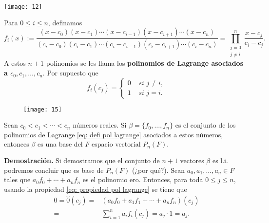 \begin{marginfigure}
\texttt{[image: 12]} 
\end{marginfigure}

Para $0 \leq i \leq n$, definamos
\begin{equation}
	\label{eq: defi pol lagrange}
	f_{i}(x) := \frac{
	(x-c_{0}) (x-c_{1}) \cdots (x-c_{i-1})
	(x-c_{i+1}) \cdots (x-c_{n})
	}{(c_{i} - c_{0}) (c_{i}-c_{1}) \cdots
	(c_{i}-c_{i-1})(c_{i}-c_{i+1}) \cdots (c_{i}-c_{n}) }
	= \prod_{\substack{j=0 \\ j \neq i}}^{n} \frac{x-c_{j}}{c_{i}-c_{j}}.
\end{equation}
A estos $n+1$ polinomios se les llama los
\textbf{polinomios de Lagrange asociados a $c_{0}, c_{1}, \ldots , c_{n}$}.
Por supuesto que
\begin{equation}
	\label{eq: propiedad pol lagrange}
	f_{i}(c_{j}) 
	= \begin{cases}
	0 & \textit{ si } j \neq i, \\
	1 & \textit{ si } j = i.
	\end{cases}
\end{equation}

\begin{figure}[H]
	\centering
	\texttt{[image: 15]} 
\end{figure}	



\begin{prop}
Sean $c_{0} < c_{1} < \cdots < c_{n}$ números reales. Si
$\beta = \{ f_{0}, \ldots, f_{n} \}$ es el conjunto de los
polinomios de Lagrange 
\eqref{eq: defi pol lagrange} asociados a estos números,
entonces $\beta$ es una base del $F$ espacio vectorial
$P_{n}(F)$.
\end{prop}
\noindent
\textbf{Demostración.}
Si demostramos que el conjunto de $n+1$ vectores 
$\beta$ es l.i. podremos concluir que es base de
$P_{n}(F)$ (¿por qué?).
Sean $a_{0}, a_{1}, \ldots, a_{n} \in F$ tales que
$a_{0}f_{0} + \cdots + a_{n}f_{n}$ es el polinomio ero.
Entonces, para toda $0 \leq j \leq n$,
usando la propiedad \eqref{eq: propiedad pol lagrange}
se tiene que 
\begin{align*}
0 = \hat{0}(c_{j}) = &
(a_{0}f_{0} + a_{1}f_{1} + \cdots + a_{n}f_{n})(c_{j}) \\
= & \sum_{i=1}^{n} a_{i}f_{i}(c_{j}) = a_{j} \cdot 1 = a_{j}.
\end{align*}

